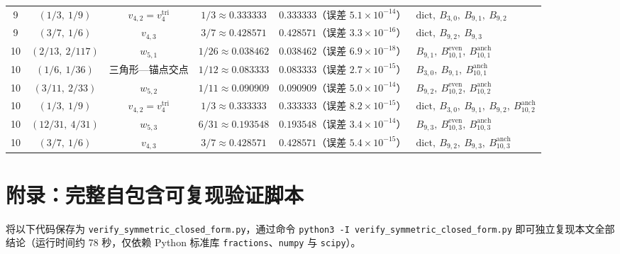 \documentclass[11pt,a4paper]{article}
\theoremstyle{definition}
\theoremstyle{remark}
\begin{document}
\begin{table}[htbp]
{\begin{tabular}{@{}c c c c c l@{}}
\midrule
9 & $(1/3,\ 1/9)$ & $v_{4,2} = v^{\mathrm{tri}}_4$ & $1/3 \approx 0.333333$ & $0.333333$（误差 $5.1\times 10^{-14}$） & $\mathrm{dict},\ B_{3,0},\ B_{9,1},\ B_{9,2}$ \\
9 & $(3/7,\ 1/6)$ & $v_{4,3}$ & $3/7 \approx 0.428571$ & $0.428571$（误差 $3.3\times 10^{-16}$） & $\mathrm{dict},\ B_{9,2},\ B_{9,3}$ \\
\midrule
10 & $(2/13,\ 2/117)$ & $w_{5,1}$ & $1/26 \approx 0.038462$ & $0.038462$（误差 $6.9\times 10^{-18}$） & $B_{9,1},\ B^{\mathrm{even}}_{10,1},\ B^{\mathrm{anch}}_{10,1}$ \\
10 & $(1/6,\ 1/36)$ & 三角形—锚点交点 & $1/12 \approx 0.083333$ & $0.083333$（误差 $2.7\times 10^{-15}$） & $B_{3,0},\ B_{9,1},\ B^{\mathrm{anch}}_{10,1}$ \\
10 & $(3/11,\ 2/33)$ & $w_{5,2}$ & $1/11 \approx 0.090909$ & $0.090909$（误差 $5.0\times 10^{-14}$） & $B_{9,2},\ B^{\mathrm{even}}_{10,2},\ B^{\mathrm{anch}}_{10,2}$ \\
10 & $(1/3,\ 1/9)$ & $v_{4,2} = v^{\mathrm{tri}}_4$ & $1/3 \approx 0.333333$ & $0.333333$（误差 $8.2\times 10^{-15}$） & $\mathrm{dict},\ B_{3,0},\ B_{9,1},\ B_{9,2},\ B^{\mathrm{anch}}_{10,2}$ \\
10 & $(12/31,\ 4/31)$ & $w_{5,3}$ & $6/31 \approx 0.193548$ & $0.193548$（误差 $3.4\times 10^{-14}$） & $B_{9,3},\ B^{\mathrm{even}}_{10,3},\ B^{\mathrm{anch}}_{10,3}$ \\
10 & $(3/7,\ 1/6)$ & $v_{4,3}$ & $3/7 \approx 0.428571$ & $0.428571$（误差 $5.4\times 10^{-15}$） & $\mathrm{dict},\ B_{9,2},\ B_{9,3},\ B^{\mathrm{anch}}_{10,3}$ \\
\bottomrule
\end{tabular}}
\end{table}

\appendix
\section{附录：完整自包含可复现验证脚本}

将以下代码保存为 \texttt{verify\_symmetric\_closed\_form.py}，通过命令 \texttt{python3 -I verify\_symmetric\_closed\_form.py} 即可独立复现本文全部结论（运行时间约 78 秒，仅依赖 Python 标准库 \texttt{fractions}、\texttt{numpy} 与 \texttt{scipy}）。
\end{document}
